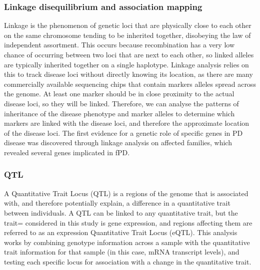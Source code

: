 \documentclass{article}
\begin{document}
\subsubsection{Linkage disequilibrium and association mapping}
\label{subsubsec:linkage}
Linkage is the phenomenon of genetic loci that are physically close to each other on the same chromosome tending to be inherited together, disobeying the law of independent assortment. This occurs because recombination has a very low chance of occurring between two loci that are next to each other,  so linked alleles are typically inherited together on a single haplotype. Linkage analysis relies on this to track disease loci without directly knowing its location, as there are many commercially available sequencing chips that contain markers alleles spread across the genome. At least one marker should be in close proximity to the actual disease loci, so they will be linked. Therefore, we can analyse the patterns of inheritance of the disease phenotype and marker alleles to determine which markers are linked with the disease loci, and therefore the approximate location of the disease loci.
The first evidence for a genetic role of specific genes in PD disease was discovered through linkage analysis on affected families, which revealed several genes implicated in fPD\cite{Abbas1999AEurope,Maher2002SegregationGene,West2004GeneticsDisease}.
\subsubsection{QTL}
\label{subsubsec:QTL}
A Quantitative Trait Locus (QTL) is a regions of the genome that is associated with, and therefore potentially explain, a difference in a quantitative trait between individuals. A QTL can be linked to any quantitative trait, but the trait= considered in this study is gene expression, and regions affecting them are referred to as an expression Quantitative Trait Locus (eQTL).
This analysis works by combining genotype information across a sample with the quantitative trait information for that sample (in this case, mRNA transcript levels), and testing each specific locus for association with a change in the quantitative trait. 
\end{document}
